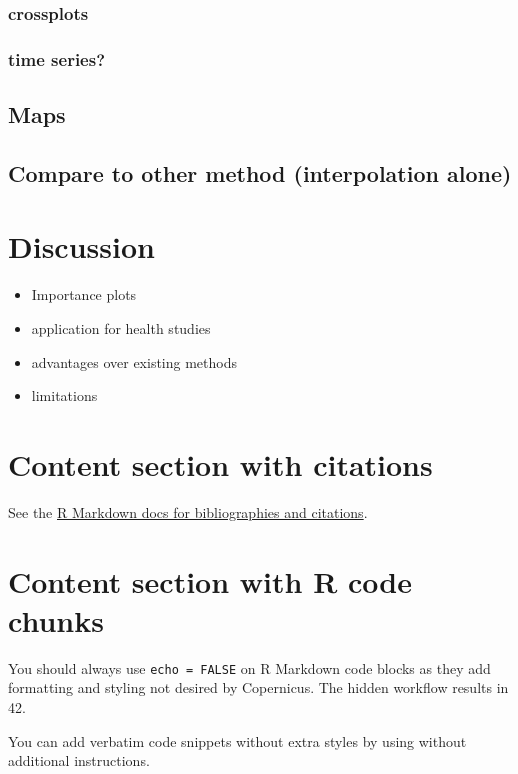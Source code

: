 \documentclass[gmd, manuscript]{copernicus}
\providecommand{\tightlist}{%
  \setlength{\itemsep}{0pt}\setlength{\parskip}{0pt}}
\begin{document}
\subsubsection{crossplots}

\subsubsection{time series?}

\subsection{Maps}

\subsection{Compare to other method (interpolation alone)}

\section{Discussion}

\begin{itemize}
\tightlist
\item
  Importance plots
\item
  application for health studies
\item
  advantages over existing methods
\item
  limitations
\end{itemize}

\section{Content section with citations}

See the
\href{http://rmarkdown.rstudio.com/authoring_bibliographies_and_citations.html}{R
Markdown docs for bibliographies and citations}.

\section{Content section with R code chunks}

You should always use \texttt{echo\ =\ FALSE} on R Markdown code blocks
as they add formatting and styling not desired by Copernicus. The hidden
workflow results in 42.

You can add verbatim code snippets without extra styles by using
\texttt{\textasciigrave{}\textasciigrave{}\textasciigrave{}} without
additional instructions.
\end{document}
